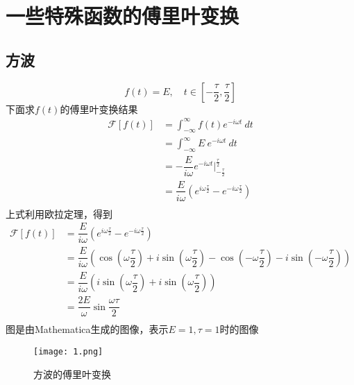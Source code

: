 \chapter{一些特殊函数的傅里叶变换}
    \section{方波}
        \begin{equation}
            f(t)=E, \quad t\in \left[-\frac{\tau}{2}, \frac{\tau}{2}\right]
            \label{eq: 2.1}
        \end{equation}
        下面求$f(t)$的傅里叶变换结果
        \begin{equation}
            \begin{split}
                \mathscr{F}[f(t)] &= \int_{-\infty}^{\infty}f(t)e^{-i\omega t}\ dt\\
                &= \int_{-\infty}^{\infty}E\ e^{-i\omega t}\ dt\\
                &= -\dfrac{E}{i\omega}e^{-i\omega t}|_{-\frac{\tau}{2}}^{\frac{\tau}{2}}\\
                &= \dfrac{E}{i\omega}(e^{i\omega \frac{\tau}{2}}-e^{-i\omega\frac{\tau}{2}})\\
            \end{split}
            \label{eq: 2.2}
        \end{equation}
        上式利用欧拉定理，得到
        \begin{equation}
            \begin{split}
                \mathscr{F}[f(t)] &= \dfrac{E}{i\omega}(e^{i\omega \frac{\tau}{2}}-e^{-i\omega\frac{\tau}{2}})\\
                &= \dfrac{E}{i\omega}(\cos (\omega \dfrac{\tau}{2}) +i \sin(\omega \dfrac{\tau}{2})-\cos (-\omega \dfrac{\tau}{2}) -i \sin(-\omega \dfrac{\tau}{2}))\\
                &= \dfrac{E}{i\omega}(i \sin(\omega \dfrac{\tau}{2}) +i \sin(\omega \dfrac{\tau}{2}))\\
                &= \dfrac{2E}{\omega}\sin\dfrac{\omega\tau}{2}\\
            \end{split}
            \label{eq: 2.3}
        \end{equation}
        图是由Mathematica生成的图像，表示$E = 1, \tau = 1$时的图像
        
        \begin{figure}[h]
            \centering
            \texttt{[image: 1.png]}
            \caption{方波的傅里叶变换}
            \label{fig: 2.1}
        \end{figure}

